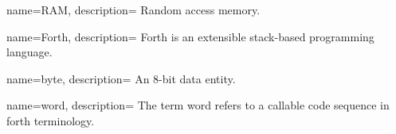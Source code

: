 
 {
    name={RAM},
    description={
      Random access memory.
      \nopostdesc
    }
}

 {
    name={Forth},
    description={
      Forth is an extensible stack-based programming language.
      \nopostdesc
    }
}
 
 {
    name={byte},
    description={
      An 8-bit data entity.
      \nopostdesc
    }
}

 {
    name={word},
    description={
      The term word  refers to a callable code sequence in \Gls{forth} terminology.
      \nopostdesc
    }
}

